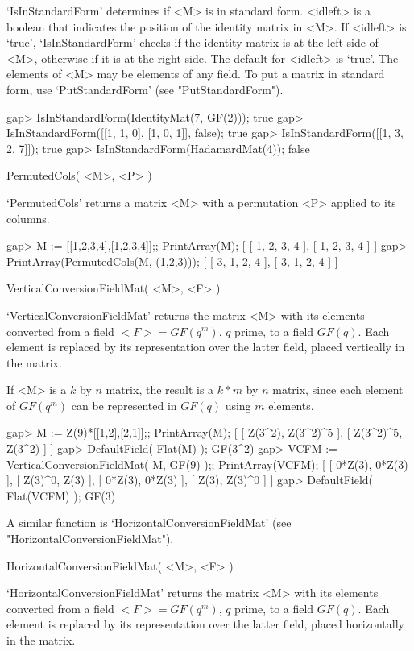 `IsInStandardForm' determines if  <M> is in  standard form. <idleft> is a
boolean that indicates  the position of the  identity  matrix in  <M>. If
<idleft> is `true', `IsInStandardForm'  checks if the identity matrix  is
at  the  left side of  <M>, otherwise  if it  is  at  the right side. The
default for <idleft>  is `true'. The elements  of <M> may be elements  of
any field.  To put a matrix  in standard form, use `PutStandardForm' (see
"PutStandardForm").

\beginexample
gap> IsInStandardForm(IdentityMat(7, GF(2)));
true
gap> IsInStandardForm([[1, 1, 0], [1, 0, 1]], false);
true
gap> IsInStandardForm([[1, 3, 2, 7]]);
true
gap> IsInStandardForm(HadamardMat(4));
false 
\endexample

\>PermutedCols( <M>, <P> )

`PermutedCols' returns a matrix <M> with a permutation <P> applied to its
columns.

\beginexample
gap> M := [[1,2,3,4],[1,2,3,4]];; PrintArray(M);
[ [  1,  2,  3,  4 ],
  [  1,  2,  3,  4 ] ]
gap> PrintArray(PermutedCols(M, (1,2,3)));
[ [  3,  1,  2,  4 ],
  [  3,  1,  2,  4 ] ] 
\endexample

\>VerticalConversionFieldMat( <M>, <F> )

`VerticalConversionFieldMat'  returns the matrix   <M> with  its elements
converted from a field $<F>=GF(q^m)$, $q$ prime, to a field $GF(q)$. Each
element is  replaced by its  representation over the latter field, placed
vertically in the matrix.

If <M>  is a $k$ by  $n$ matrix, the result is   a $k*m$ by  $n$ matrix,
since each element of $GF(q^m)$  can be represented  in $GF(q)$ using $m$
elements.

\beginexample
gap> M := Z(9)*[[1,2],[2,1]];; PrintArray(M);
[ [    Z(3^2),  Z(3^2)^5 ],
  [  Z(3^2)^5,    Z(3^2) ] ]
gap> DefaultField( Flat(M) );
GF(3^2)
gap> VCFM := VerticalConversionFieldMat( M, GF(9) );; PrintArray(VCFM);
[ [  0*Z(3),  0*Z(3) ],
  [  Z(3)^0,    Z(3) ],
  [  0*Z(3),  0*Z(3) ],
  [    Z(3),  Z(3)^0 ] ]
gap> DefaultField( Flat(VCFM) );
GF(3) 
\endexample

A similar function is `HorizontalConversionFieldMat' (see
"HorizontalConversionFieldMat").

\>HorizontalConversionFieldMat( <M>, <F> )

`HorizontalConversionFieldMat'  returns the matrix  <M> with its elements
converted from a field $<F>=GF(q^m)$, $q$ prime, to a field $GF(q)$. Each
element  is replaced by its  representation over the latter field, placed
horizontally in the matrix.

